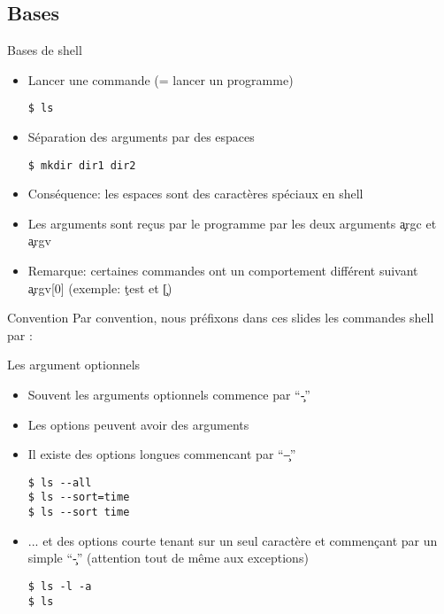 \subsection{Bases}

\begin{frame}[fragile=singleslide]{Bases de shell}
  \begin{itemize}
  \item Lancer une commande (= lancer un programme)
    \begin{lstlisting}
$ ls
    \end{lstlisting} %
  \item Séparation des arguments par des espaces
    \begin{lstlisting}
$ mkdir dir1 dir2
    \end{lstlisting} %
  \item Conséquence: les espaces sont des caractères spéciaux en shell
  \item  Les  arguments sont  reçus  par  le  programme par  les  deux
    arguments \c{argc} et \c{argv}
  \item  Remarque: certaines commandes  ont un  comportement différent
    suivant \c{argv[0]} (exemple: \c{test} et \c{[})
  \end{itemize}
\end{frame}

\begin{frame}[fragile=singleslide]{Convention}
  Par convention,  nous préfixons dans ces slides  les commandes shell
  par :
\end{frame}

\begin{frame}[fragile=singleslide]{Les argument optionnels}
  \begin{itemize}
  \item Souvent les arguments optionnels commence par ``\c{-}''
  \item Les options peuvent avoir des arguments
  \item Il existe des options longues commencant par ``\c{--}''
    \begin{lstlisting}
$ ls --all
$ ls --sort=time
$ ls --sort time
    \end{lstlisting}
  \item  ... et des  options courte  tenant sur  un seul  caractère et
    commençant  par un  simple  ``\c{-}'' (attention  tout  de même  aux
    exceptions)
    \begin{lstlisting}
$ ls -l -a
$ ls
    \end{lstlisting}
  \end{itemize}
\end{frame}

